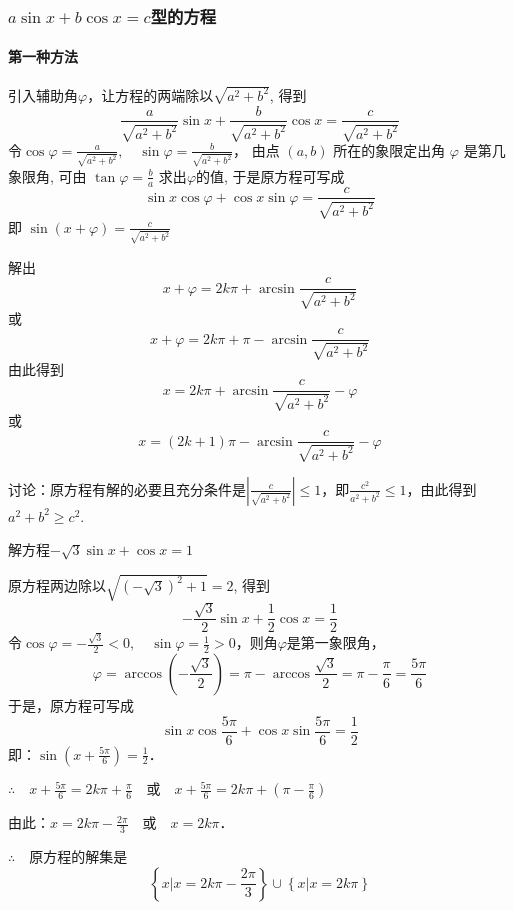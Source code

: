 \subsubsection{$a\sin x +b\cos x=c$型的方程}

\paragraph{第一种方法} 引入辅助角$\varphi$，让方程的两端除以$\sqrt{a^2+b^2}$, 得到
\[\frac{a}{\sqrt{a^{2}+b^{2}}} \sin x+\frac{b}{\sqrt{a^{2}+b^{2}}} \cos x=\frac{c}{\sqrt{a^{2}+b^{2}}}\]
令$\cos \varphi=\frac{a}{\sqrt{a^{2}+b^{2}}}, \quad \sin \varphi=\frac{b}{\sqrt{a^{2}+b^{2}}}$，
由点 $(a, b)$ 所在的象限定出角 $\varphi$ 是第几象限角, 可由 
$\tan \varphi=\frac{b}{a}$ 求出$\varphi$的值, 于是原方程可写成
\[\sin x \cos \varphi+\cos x \sin \varphi=\frac{c}{\sqrt{a^{2}+b^{2}}}\]
即 $\sin (x+\varphi)=\frac{c}{\sqrt{a^{2}+b^{2}}}$

解出 
\begin{equation}
    x+\varphi=2 k \pi+\arcsin \frac{c}{\sqrt{a^{2}+b^{2}}}
\end{equation}
或
\begin{equation}
    x+\varphi=2 k \pi+\pi-\arcsin \frac{c}{\sqrt{a^{2}+b^{2}}}
\end{equation}
由此得到
\[x=2 k \pi+\arcsin \frac{c}{\sqrt{a^{2}+b^{2}}}-\varphi\]
或
\[x=(2 k+1) \pi-\arcsin \frac{c}{\sqrt{a^{2}+b^{2}}}-\varphi\]

讨论：原方程有解的必要且充分条件是$\left| \frac{c}{\sqrt{a^{2}+b^{2}}}\right|\le 1$，即$\frac{c^2}{a^2+b^2}\le 1$，由此得到
$a^2+b^2\ge c^2$.

\begin{example}
    解方程$-\sqrt{3}\sin x+\cos x=1$
\end{example}

\begin{solution}
    原方程两边除以$\sqrt{(-\sqrt{3})^2+1}=2$, 得到
\[-\frac{\sqrt{3}}{2}\sin x+\frac{1}{2}\cos x=\frac{1}{2}\]
令$\cos\varphi=-\frac{\sqrt{3}}{2}<0,\quad \sin\varphi=\frac{1}{2}>0$，则角$\varphi$是第一象限角，
\[\varphi=\arccos\left(-\frac{\sqrt{3}}{2}\right)=\pi-\arccos\frac{\sqrt{3}}{2}=\pi-\frac{\pi}{6}=\frac{5\pi}{6}\]
于是，原方程可写成
\[\sin x\cos\frac{5\pi}{6}+\cos x\sin \frac{5\pi}{6}=\frac{1}{2}\]
即：$\sin\left(x+\frac{5\pi}{6}\right)=\frac{1}{2}$．

$\therefore\quad x+\frac{5\pi}{6}=2k\pi+\frac{\pi}{6}\quad \text{或}\quad x+\frac{5\pi}{6}=2k\pi+\left(\pi-\frac{\pi}{6}\right)$

由此：$x=2k\pi-\frac{2\pi}{3}\quad \text{或}\quad x=2k\pi$．

$\therefore\quad $原方程的解集是
\[\left\{x\big|x=2k\pi-\frac{2\pi}{3}\right\}\cup \left\{x\big|x=2k\pi\right\}\]
\end{solution}

